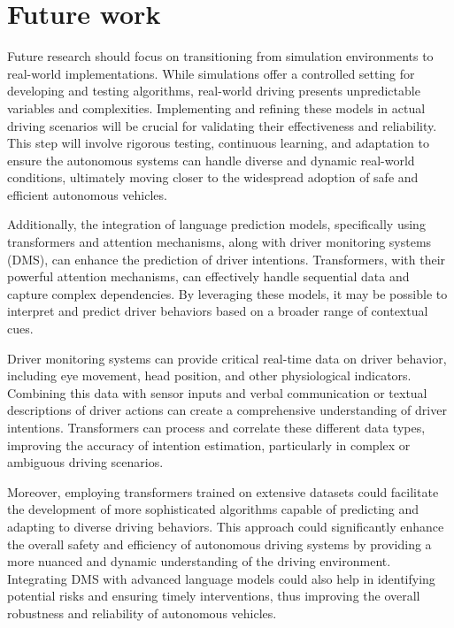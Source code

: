 
\section{Future work}
Future research should focus on transitioning from simulation environments to real-world implementations. While simulations offer a controlled setting for developing and testing algorithms, real-world driving presents unpredictable variables and complexities. Implementing and refining these models in actual driving scenarios will be crucial for validating their effectiveness and reliability. This step will involve rigorous testing, continuous learning, and adaptation to ensure the autonomous systems can handle diverse and dynamic real-world conditions, ultimately moving closer to the widespread adoption of safe and efficient autonomous vehicles.

Additionally, the integration of language prediction models, specifically using transformers and attention mechanisms, along with driver monitoring systems (DMS), can enhance the prediction of driver intentions. Transformers, with their powerful attention mechanisms, can effectively handle sequential data and capture complex dependencies. By leveraging these models, it may be possible to interpret and predict driver behaviors based on a broader range of contextual cues.

Driver monitoring systems can provide critical real-time data on driver behavior, including eye movement, head position, and other physiological indicators. Combining this data with sensor inputs and verbal communication or textual descriptions of driver actions can create a comprehensive understanding of driver intentions. Transformers can process and correlate these different data types, improving the accuracy of intention estimation, particularly in complex or ambiguous driving scenarios.

Moreover, employing transformers trained on extensive datasets could facilitate the development of more sophisticated algorithms capable of predicting and adapting to diverse driving behaviors. This approach could significantly enhance the overall safety and efficiency of autonomous driving systems by providing a more nuanced and dynamic understanding of the driving environment. Integrating DMS with advanced language models could also help in identifying potential risks and ensuring timely interventions, thus improving the overall robustness and reliability of autonomous vehicles.